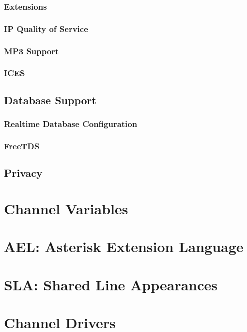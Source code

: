 \documentclass[12pt,a4]{report}
\begin{document}
    \subsection{Extensions}
    
    \subsection{IP Quality of Service}
    
    \subsection{MP3 Support}
    
    \subsection{ICES}
    
  \section{Database Support}
    \subsection{Realtime Database Configuration}
    
    \subsection{FreeTDS}
    
  \section{Privacy}
  

\chapter{Channel Variables}


\chapter{AEL: Asterisk Extension Language}


\chapter{SLA: Shared Line Appearances}


\chapter{Channel Drivers}
\end{document}
